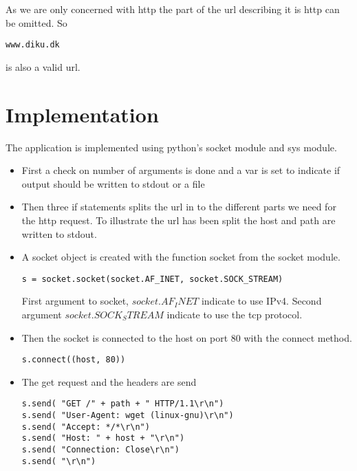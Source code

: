 \documentclass[a4paper,12pt,danish]{dnacm} %
\begin{document}
As we are only concerned with http the part of the url describing it is http can
be omitted. So
\begin{lstlisting}
www.diku.dk
\end{lstlisting}
is also a valid url.

\section{Implementation}
The application is implemented using python's socket module and sys module.
\begin{itemize}
  \item First a check on number of arguments is done and a var is set to
  indicate if output should be written to stdout or a file
  
  \item Then three if statements splits the url in to the different parts we
  need for the http request. To illustrate the url has been split the host and path
  are written to stdout.
  
  
  \item A socket object is created with the function socket from the socket
  module.
\begin{lstlisting}
s = socket.socket(socket.AF_INET, socket.SOCK_STREAM)
\end{lstlisting}
  First argument to socket, $socket.AF_INET$ indicate to use IPv4. Second
  argument $socket.SOCK_STREAM$ indicate to use the tcp protocol.
  
  \item Then the socket is connected to the host on port 80 with the connect
  method.
\begin{lstlisting}
s.connect((host, 80))
\end{lstlisting}
  
  \item
  The get request and the headers are send
\begin{lstlisting}
s.send( "GET /" + path + " HTTP/1.1\r\n")
s.send( "User-Agent: wget (linux-gnu)\r\n")
s.send( "Accept: */*\r\n")
s.send( "Host: " + host + "\r\n")
s.send( "Connection: Close\r\n")
s.send( "\r\n")
\end{lstlisting}
  

\end{itemize}
\end{document}
